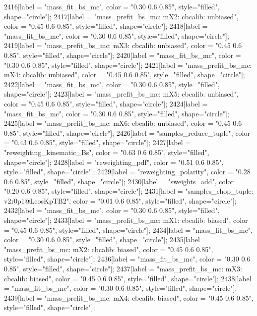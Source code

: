 {	2416[label = "mass_fit_bs_mc", color = "0.30 0.6 0.85", style="filled", shape="circle"];
	2417[label = "mass_prefit_bs_mc\nmassbin: mX2\nmassmodel: cbcalib\ntrigger: unbiased", color = "0.45 0.6 0.85", style="filled", shape="circle"];
	2418[label = "mass_fit_bs_mc", color = "0.30 0.6 0.85", style="filled", shape="circle"];
	2419[label = "mass_prefit_bs_mc\nmassbin: mX3\nmassmodel: cbcalib\ntrigger: unbiased", color = "0.45 0.6 0.85", style="filled", shape="circle"];
	2420[label = "mass_fit_bs_mc", color = "0.30 0.6 0.85", style="filled", shape="circle"];
	2421[label = "mass_prefit_bs_mc\nmassbin: mX4\nmassmodel: cbcalib\ntrigger: unbiased", color = "0.45 0.6 0.85", style="filled", shape="circle"];
	2422[label = "mass_fit_bs_mc", color = "0.30 0.6 0.85", style="filled", shape="circle"];
	2423[label = "mass_prefit_bs_mc\nmassbin: mX5\nmassmodel: cbcalib\ntrigger: unbiased", color = "0.45 0.6 0.85", style="filled", shape="circle"];
	2424[label = "mass_fit_bs_mc", color = "0.30 0.6 0.85", style="filled", shape="circle"];
	2425[label = "mass_prefit_bs_mc\nmassbin: mX6\nmassmodel: cbcalib\ntrigger: unbiased", color = "0.45 0.6 0.85", style="filled", shape="circle"];
	2426[label = "samples_reduce_tuple", color = "0.43 0.6 0.85", style="filled", shape="circle"];
	2427[label = "reweighting_kinematic_Bs", color = "0.63 0.6 0.85", style="filled", shape="circle"];
	2428[label = "reweighting_pdf", color = "0.51 0.6 0.85", style="filled", shape="circle"];
	2429[label = "reweighting_polarity", color = "0.28 0.6 0.85", style="filled", shape="circle"];
	2430[label = "sweights_add", color = "0.20 0.6 0.85", style="filled", shape="circle"];
	2431[label = "samples_chop_tuple\nversion: v2r0p1@LcosKpTB2", color = "0.01 0.6 0.85", style="filled", shape="circle"];
	2432[label = "mass_fit_bs_mc", color = "0.30 0.6 0.85", style="filled", shape="circle"];
	2433[label = "mass_prefit_bs_mc\nmassbin: mX1\nmassmodel: cbcalib\ntrigger: biased", color = "0.45 0.6 0.85", style="filled", shape="circle"];
	2434[label = "mass_fit_bs_mc", color = "0.30 0.6 0.85", style="filled", shape="circle"];
	2435[label = "mass_prefit_bs_mc\nmassbin: mX2\nmassmodel: cbcalib\ntrigger: biased", color = "0.45 0.6 0.85", style="filled", shape="circle"];
	2436[label = "mass_fit_bs_mc", color = "0.30 0.6 0.85", style="filled", shape="circle"];
	2437[label = "mass_prefit_bs_mc\nmassbin: mX3\nmassmodel: cbcalib\ntrigger: biased", color = "0.45 0.6 0.85", style="filled", shape="circle"];
	2438[label = "mass_fit_bs_mc", color = "0.30 0.6 0.85", style="filled", shape="circle"];
	2439[label = "mass_prefit_bs_mc\nmassbin: mX4\nmassmodel: cbcalib\ntrigger: biased", color = "0.45 0.6 0.85", style="filled", shape="circle"];
}
